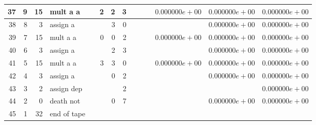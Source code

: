 \documentclass{article}
\begin{document}
\begin{tabular}{|r|r|r|l|r|r|r|r||r|r||r|r|r|r|}
37 & 9 & 15 & mult a a & & 2 & 2 & 3 & & & &$ 0.000000e+00 $&$ 0.000000e+00 $&$ 0.000000e+00 $\\ \hline 
38 & 8 & 3 & assign a & & & 3 & 0 & & & & &$ 0.000000e+00 $&$ 0.000000e+00 $\\ \hline 
39 & 7 & 15 & mult a a & & 0 & 0 & 2 & & & &$ 0.000000e+00 $&$ 0.000000e+00 $&$ 0.000000e+00 $\\ \hline 
40 & 6 & 3 & assign a & & & 2 & 3 & & & & &$ 0.000000e+00 $&$ 0.000000e+00 $\\ \hline 
41 & 5 & 15 & mult a a & & 3 & 3 & 0 & & & &$ 0.000000e+00 $&$ 0.000000e+00 $&$ 0.000000e+00 $\\ \hline 
42 & 4 & 3 & assign a & & & 0 & 2 & & & & &$ 0.000000e+00 $&$ 0.000000e+00 $\\ \hline 
43 & 3 & 2 & assign dep & & & & 2 & & & & & &$ 0.000000e+00 $\\ \hline 
44 & 2 & 0 & death not & & & 0 & 7 & & & & &$ 0.000000e+00 $&$ 0.000000e+00 $\\ \hline 
 45 & 1 & 32 & end of tape & & & & & & & & & &  \\ \hline 
\end{tabular}
\end{document}
